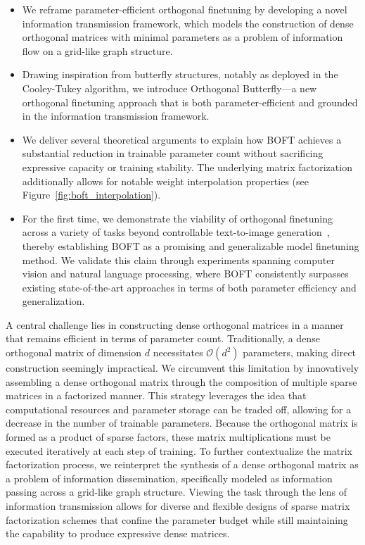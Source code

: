\begin{itemize}[leftmargin=*,nosep]
    \item We reframe parameter-efficient orthogonal finetuning by developing a novel information transmission framework, which models the construction of dense orthogonal matrices with minimal parameters as a problem of information flow on a grid-like graph structure.
    \item Drawing inspiration from butterfly structures, notably as deployed in the Cooley-Tukey algorithm, we introduce Orthogonal Butterfly—a new orthogonal finetuning approach that is both parameter-efficient and grounded in the information transmission framework.
    \item We deliver several theoretical arguments to explain how BOFT achieves a substantial reduction in trainable parameter count without sacrificing expressive capacity or training stability. The underlying matrix factorization additionally allows for notable weight interpolation properties (see Figure~\ref{fig:boft_interpolation}).
    \item For the first time, we demonstrate the viability of orthogonal finetuning across a variety of tasks beyond controllable text-to-image generation~\cite{qiu2023controlling}, thereby establishing BOFT as a promising and generalizable model finetuning method. We validate this claim through experiments spanning computer vision and natural language processing, where BOFT consistently surpasses existing state-of-the-art approaches in terms of both parameter efficiency and generalization.
\end{itemize}

A central challenge lies in constructing dense orthogonal matrices in a manner that remains efficient in terms of parameter count. Traditionally, a dense orthogonal matrix of dimension $d$ necessitates $\mathcal{O}(d^2)$ parameters, making direct construction seemingly impractical. We circumvent this limitation by innovatively assembling a dense orthogonal matrix through the composition of multiple sparse matrices in a factorized manner. This strategy leverages the idea that computational resources and parameter storage can be traded off, allowing for a decrease in the number of trainable parameters. Because the orthogonal matrix is formed as a product of sparse factors, these matrix multiplications must be executed iteratively at each step of training. To further contextualize the matrix factorization process, we reinterpret the synthesis of a dense orthogonal matrix as a problem of information dissemination, specifically modeled as information passing across a grid-like graph structure. Viewing the task through the lens of information transmission allows for diverse and flexible designs of sparse matrix factorization schemes that confine the parameter budget while still maintaining the capability to produce expressive dense matrices.

